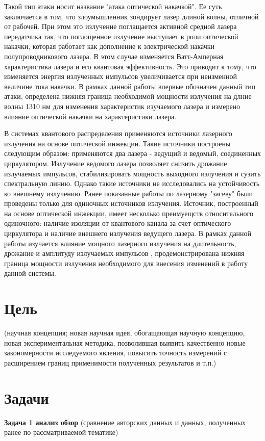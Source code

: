 Такой тип атаки носит название "атака оптической накачкой". Ее суть заключается в том, что злоумышленник зондирует лазер длиной волны, отличной от рабочей. При этом это излучение поглащается активной средной лазера передатчика так, что поглощенное излучение выступает в роли оптической накачки, которая работает как дополнение к электрической накачки полупроводникового лазера. В этом случае изменяется Ватт-Амперная характеристика лазера и его квантовая эффективность. Это приводит к тому, что изменяется энергия излученных импульсов увеличивается при неизменной величине тока накачки. В рамках данной работы впервые обозначен данный тип атаки, определена нижняя граница необходимой мощности излучения на длние волны 1310 нм для изменения характеристик изучаемого лазера и измерено влияние оптической накачки на характеристики лазера. 

В системах квантового распределения применяются  источники лазерного излучения на основе оптической инжекции. Такие источники построены следующим образом: применяются два лазера - ведущий и ведомый, соединенных циркулятором. Излучение ведомого лазера позволяет снизить дрожание излучаемых импульсов, стабилизировать мощность выходного излучения и сузить спектральную линию. Однако такие источники не исследовались на устойчивость ко внешнему излучению. Ранее показанные работы по лазерному "засеву" были проведены только для одиночных источников излучения. Источник, построенный на основе оптической инжекции, имеет несколько преимуещств относительного одиночного: наличие изоляции от квантового канала за счет оптического циркулятора и наличие внешнего излучения ведущего лазера. В рамках данной работы изучается влияние мощного лазерного излучения на длительность, дрожание и амплитуду излучаемых импульсов , продемонстрирована нижняя граница мощности излучения необходимого  для внесения изменений в работу данной системы.
\section*{Цель}
(научная концепция; новая научная идея, обогащающая научную концепцию, новая экспериментальная методика, позволившая выявить качественно новые закономерности исследуемого явления, повысить точность измерений с расширением границ применимости полученных результатов и т.п.)
\section*{Задачи}
\textbf{Задача 1 анализ обзор}
(сравнение авторских данных и данных, полученных ранее по рассматриваемой тематике)\\

